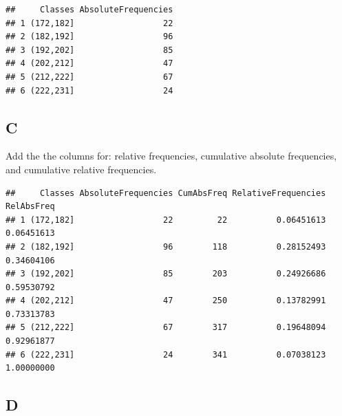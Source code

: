 \documentclass[
]{article}
\newenvironment{Shaded}{\begin{snugshade}}{\end{snugshade}}
\newcommand{\FunctionTok}[1]{\textcolor[rgb]{0.13,0.29,0.53}{\textbf{#1}}}
\newcommand{\NormalTok}[1]{#1}
\newcommand{\OtherTok}[1]{\textcolor[rgb]{0.56,0.35,0.01}{#1}}
\newcommand{\SpecialCharTok}[1]{\textcolor[rgb]{0.81,0.36,0.00}{\textbf{#1}}}
\begin{document}
\begin{verbatim}
##     Classes AbsoluteFrequencies
## 1 (172,182]                  22
## 2 (182,192]                  96
## 3 (192,202]                  85
## 4 (202,212]                  47
## 5 (212,222]                  67
## 6 (222,231]                  24
\end{verbatim}

\hypertarget{c-1}{%
\subsection{C}\label{c-1}}

Add the the columns for: relative frequencies, cumulative absolute
frequencies, and cumulative relative frequencies.

\begin{Shaded}
\end{Shaded}

\begin{verbatim}
##     Classes AbsoluteFrequencies CumAbsFreq RelativeFrequencies RelAbsFreq
## 1 (172,182]                  22         22          0.06451613 0.06451613
## 2 (182,192]                  96        118          0.28152493 0.34604106
## 3 (192,202]                  85        203          0.24926686 0.59530792
## 4 (202,212]                  47        250          0.13782991 0.73313783
## 5 (212,222]                  67        317          0.19648094 0.92961877
## 6 (222,231]                  24        341          0.07038123 1.00000000
\end{verbatim}

\hypertarget{d-1}{%
\subsection{D}\label{d-1}}
\end{document}
